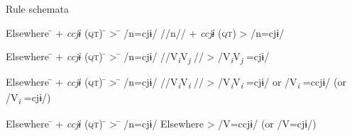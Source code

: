 \ea\label{ex:10.59}   Rule schemata\\
  \ea 
  \begin{tabbing}
  Elsewhere \hspace{\tabcolsep}\=\hspace{\tabcolsep} +  \textit{ccjɨ} (\textsc{qt}) \hspace{\tabcolsep}\=\hspace{\tabcolsep} > \hspace{\tabcolsep}\=\hspace{\tabcolsep} /n=cjɨ/\kill
  //n// \> + \textit{ccjɨ} (\textsc{qt}) \> > \> /n=cjɨ/
  \end{tabbing}
  \ex  \begin{tabbing}
  Elsewhere \hspace{\tabcolsep}\=\hspace{\tabcolsep} +  \textit{ccjɨ} (\textsc{qt}) \hspace{\tabcolsep}\=\hspace{\tabcolsep} > \hspace{\tabcolsep}\=\hspace{\tabcolsep} /n=cjɨ/\kill
  //V\textit{\textsubscript{i}}V\textit{\textsubscript{j} }//  \>   \> > \> /V\textit{\textsubscript{i}}V\textit{\textsubscript{j} }=cjɨ/
  \end{tabbing}
  \ex \begin{tabbing}
  Elsewhere \hspace{\tabcolsep}\=\hspace{\tabcolsep} +  \textit{ccjɨ} (\textsc{qt}) \hspace{\tabcolsep}\=\hspace{\tabcolsep} > \hspace{\tabcolsep}\=\hspace{\tabcolsep} /n=cjɨ/\kill
  //V\textit{\textsubscript{i}}V\textit{\textsubscript{i} }// \> \>     > \> /V\textit{\textsubscript{i}}V\textit{\textsubscript{i} }=cjɨ/ or /V\textit{\textsubscript{i} }=ccjɨ/ (or /V\textit{\textsubscript{i} }=cjɨ/)
  \end{tabbing}
  \ex \begin{tabbing}
  Elsewhere \hspace{\tabcolsep}\=\hspace{\tabcolsep} +  \textit{ccjɨ} (\textsc{qt}) \hspace{\tabcolsep}\=\hspace{\tabcolsep} > \hspace{\tabcolsep}\=\hspace{\tabcolsep} /n=cjɨ/\kill
  Elsewhere    \> \>  > \>  /V=ccjɨ/ (or /V=cjɨ/)
  \end{tabbing}
\z
\z

